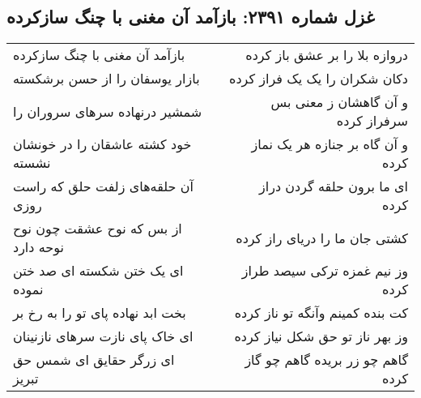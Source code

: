 \begin{center}
\section*{غزل شماره ۲۳۹۱: بازآمد آن مغنی با چنگ سازکرده}
\label{sec:2391}
\begin{longtable}{l p{0.5cm} r}
بازآمد آن مغنی با چنگ سازکرده
&&
دروازه بلا را بر عشق باز کرده
\\
بازار یوسفان را از حسن برشکسته
&&
دکان شکران را یک یک فراز کرده
\\
شمشیر درنهاده سرهای سروران را
&&
و آن گاهشان ز معنی بس سرفراز کرده
\\
خود کشته عاشقان را در خونشان نشسته
&&
و آن گاه بر جنازه هر یک نماز کرده
\\
آن حلقه‌های زلفت حلق که راست روزی
&&
ای ما برون حلقه گردن دراز کرده
\\
از بس که نوح عشقت چون نوح نوحه دارد
&&
کشتی جان ما را دریای راز کرده
\\
ای یک ختن شکسته ای صد ختن نموده
&&
وز نیم غمزه ترکی سیصد طراز کرده
\\
بخت ابد نهاده پای تو را به رخ بر
&&
کت بنده کمینم وآنگه تو ناز کرده
\\
ای خاک پای نازت سرهای نازنینان
&&
وز بهر ناز تو حق شکل نیاز کرده
\\
ای زرگر حقایق ای شمس حق تبریز
&&
گاهم چو زر بریده گاهم چو گاز کرده
\\
\end{longtable}
\end{center}
